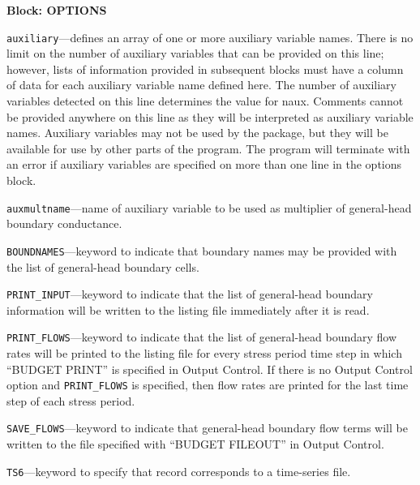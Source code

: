 
\item \textbf{Block: OPTIONS}

\begin{description}
\item \texttt{auxiliary}---defines an array of one or more auxiliary variable names.  There is no limit on the number of auxiliary variables that can be provided on this line; however, lists of information provided in subsequent blocks must have a column of data for each auxiliary variable name defined here.   The number of auxiliary variables detected on this line determines the value for naux.  Comments cannot be provided anywhere on this line as they will be interpreted as auxiliary variable names.  Auxiliary variables may not be used by the package, but they will be available for use by other parts of the program.  The program will terminate with an error if auxiliary variables are specified on more than one line in the options block.

\item \texttt{auxmultname}---name of auxiliary variable to be used as multiplier of general-head boundary conductance.

\item \texttt{BOUNDNAMES}---keyword to indicate that boundary names may be provided with the list of general-head boundary cells.

\item \texttt{PRINT\_INPUT}---keyword to indicate that the list of general-head boundary information will be written to the listing file immediately after it is read.

\item \texttt{PRINT\_FLOWS}---keyword to indicate that the list of general-head boundary flow rates will be printed to the listing file for every stress period time step in which ``BUDGET PRINT'' is specified in Output Control.  If there is no Output Control option and \texttt{PRINT\_FLOWS} is specified, then flow rates are printed for the last time step of each stress period.

\item \texttt{SAVE\_FLOWS}---keyword to indicate that general-head boundary flow terms will be written to the file specified with ``BUDGET FILEOUT'' in Output Control.

\item \texttt{TS6}---keyword to specify that record corresponds to a time-series file.


\end{description}
